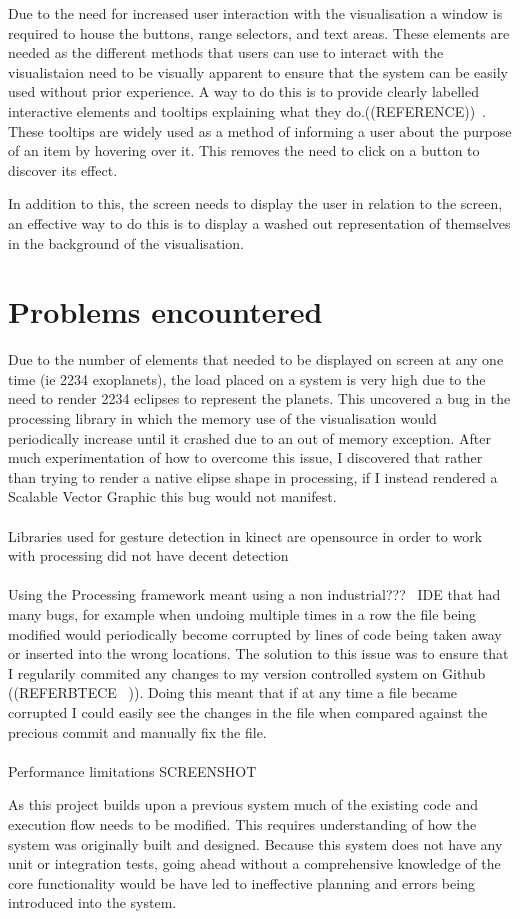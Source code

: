 Due to the need for increased user interaction with the visualisation a window
is required to house the buttons, range selectors, and text areas. These
elements are needed as the different methods that users can use to interact with
the visualistaion need to be visually apparent to ensure that the system can be
easily used without prior experience. A way to do this is to provide clearly
labelled interactive elements and tooltips explaining what they
do.((REFERENCE))~. These tooltips are widely used as a method of informing a
user about the purpose of an item by hovering over it. This removes the need to
click on a button to discover its effect.


In addition to this, the screen needs to display the user in relation to the
screen, an effective way to do this is to display a washed out representation of
themselves in the background of the visualisation.
\section{Problems encountered}
Due to the number of elements that needed to be displayed on screen at any one
time (ie 2234 exoplanets), the load placed on a system is very high due to the
need to render 2234 eclipses to represent the planets. This uncovered a bug in
the processing library in which the memory use of the visualisation would
periodically increase until it crashed due to an out of memory exception. After
much experimentation of how to overcome this issue, I discovered that rather
than trying to render a native elipse shape in processing, if I instead rendered
a Scalable Vector Graphic this bug would not manifest. 
\\\\
Libraries used for gesture detection in kinect are opensource in order to work
with processing did not have decent detection
\\\\
Using the Processing framework meant using a non industrial???~ IDE that had
many bugs, for example when undoing multiple times in a row the file being
modified would periodically become corrupted by lines of code being taken away
or inserted into the wrong locations. The solution to this issue was to ensure
that I regularily commited any changes to my version controlled system on Github
((REFERBTECE ~)). Doing this meant that if at any time a file became corrupted I
could easily see the changes in the file when compared against the precious
commit and manually fix the file. 
\\\\
Performance limitations
SCREENSHOT ~

As this project builds upon a previous system much of the existing code and
execution flow needs to be modified. This requires understanding of how the
system was originally built and designed. Because this system does not have any
unit or integration tests, going ahead without a comprehensive knowledge of the
core functionality would be have led to ineffective planning and errors being
introduced into the system.
